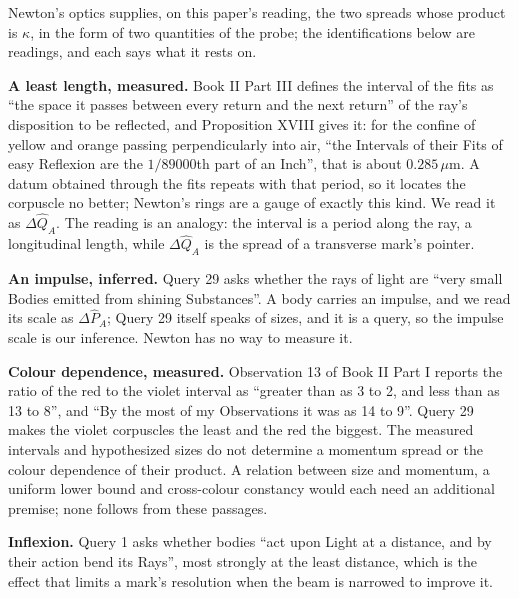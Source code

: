 \documentclass[11pt,a4paper]{article}
\begin{document}
Newton's optics supplies, on this paper's reading, the two spreads whose
product is \(\kappa\), in the form of two quantities of the probe; the
identifications below are readings, and each says what it rests on.

\textbf{A least length, measured.} Book II Part III defines the interval
of the fits as ``the space it passes between every return and the next
return'' of the ray's disposition to be reflected, and Proposition XVIII
gives it: for the confine of yellow and orange passing perpendicularly
into air, ``the Intervals of their Fits of easy Reflexion are the
\(1/89000\)th part of an Inch'', that is about \(0.285\,\mu\mathrm{m}\).
A datum obtained through the fits repeats with that period, so it
locates the corpuscle no better; Newton's rings are a gauge of exactly
this kind. We read it as \(\Delta\hat Q_A\). The reading is an analogy:
the interval is a period along the ray, a longitudinal length, while
\(\Delta\hat Q_A\) is the spread of a transverse mark's pointer.

\textbf{An impulse, inferred.} Query 29 asks whether the rays of light
are ``very small Bodies emitted from shining Substances''. A body
carries an impulse, and we read its scale as \(\Delta\hat P_A\); Query
29 itself speaks of sizes, and it is a query, so the impulse scale is
our inference. Newton has no way to measure it.

\textbf{Colour dependence, measured.} Observation 13 of Book II Part I
reports the ratio of the red to the violet interval as ``greater than as
3 to 2, and less than as 13 to 8'', and ``By the most of my Observations
it was as 14 to 9''. Query 29 makes the violet corpuscles the least and
the red the biggest. The measured intervals and hypothesized sizes do
not determine a momentum spread or the colour dependence of their
product. A relation between size and momentum, a uniform lower bound and
cross-colour constancy would each need an additional premise; none
follows from these passages.

\textbf{Inflexion.} Query 1 asks whether bodies ``act upon Light at a
distance, and by their action bend its Rays'', most strongly at the
least distance, which is the effect that limits a mark's resolution when
the beam is narrowed to improve it.
\end{document}
